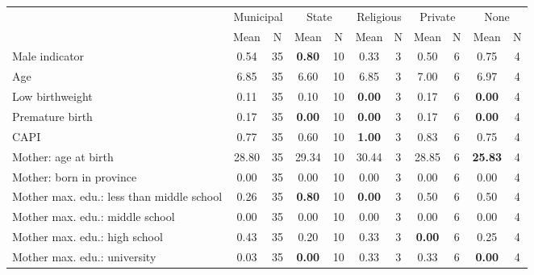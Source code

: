 \begin{tabular}{l c c c c c c c c c c}
\toprule
& \multicolumn{2}{c}{Municipal} & \multicolumn{2}{c}{State} & \multicolumn{2}{c}{Religious} & \multicolumn{2}{c}{Private} & \multicolumn{2}{c}{None} \\
& \scriptsize Mean & \scriptsize N & \scriptsize Mean & \scriptsize N & \scriptsize Mean & \scriptsize N & \scriptsize Mean & \scriptsize N & \scriptsize Mean & \scriptsize N \\
\midrule
Male indicator &      0.54 &        35 & \textbf{     0.80} &        10 &      0.33 &         3 &      0.50 &         6 &      0.75 &         4 \\
Age &      6.85 &        35 &      6.60 &        10 &      6.85 &         3 &      7.00 &         6 &      6.97 &         4 \\
Low birthweight &      0.11 &        35 &      0.10 &        10 & \textbf{     0.00} &         3 &      0.17 &         6 & \textbf{     0.00} &         4 \\
Premature birth &      0.17 &        35 & \textbf{     0.00} &        10 & \textbf{     0.00} &         3 &      0.17 &         6 & \textbf{     0.00} &         4 \\
CAPI &      0.77 &        35 &      0.60 &        10 & \textbf{     1.00} &         3 &      0.83 &         6 &      0.75 &         4 \\
Mother: age at birth &     28.80 &        35 &     29.34 &        10 &     30.44 &         3 &     28.85 &         6 & \textbf{    25.83} &         4 \\
Mother: born in province &      0.00 &        35 &      0.00 &        10 &      0.00 &         3 &      0.00 &         6 &      0.00 &         4 \\
Mother max. edu.: less than middle school &      0.26 &        35 & \textbf{     0.80} &        10 & \textbf{     0.00} &         3 &      0.50 &         6 &      0.50 &         4 \\
Mother max. edu.: middle school &      0.00 &        35 &      0.00 &        10 &      0.00 &         3 &      0.00 &         6 &      0.00 &         4 \\
Mother max. edu.: high school &      0.43 &        35 &      0.20 &        10 &      0.33 &         3 & \textbf{     0.00} &         6 &      0.25 &         4 \\
Mother max. edu.: university &      0.03 &        35 & \textbf{     0.00} &        10 &      0.33 &         3 &      0.33 &         6 & \textbf{     0.00} &         4 \\

\end{tabular}
